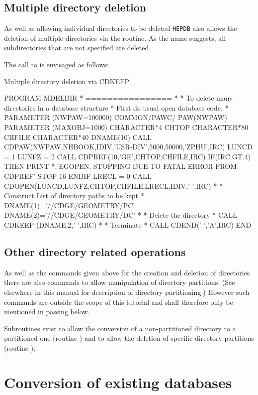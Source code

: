 \subsection{Multiple directory deletion}
As well as allowing individual directories to be deleted {\tt HEPDB} also
allows the deletion of multiple directories via the  routine.
As the name suggests, all subdirectories that are not specified are deleted.

The call to  is envisaged as follows:
%
\begin{XMPt}{Multiple directory deletion via CDKEEP}

      PROGRAM MDELDIR
*     ================
*
*     To delete many directories in a database structure
*     First do usual open database code.
*
      PARAMETER    (NWPAW=100000)
      COMMON/PAWC/ PAW(NWPAW)
      PARAMETER    (MAXOBJ=1000)
      CHARACTER*4  CHTOP
      CHARACTER*80 CHFILE
      CHARACTER*40 DNAME(10)
      CALL CDPAW(NWPAW,NHBOOK,IDIV,'USR-DIV',5000,50000,'ZPHU',IRC)
      LUNCD  = 1
      LUNFZ  = 2
      CALL CDPREF(10,'GE',CHTOP,CHFILE,IRC)
      IF(IRC.GT.4) THEN
         PRINT *,'EGOPEN. STOPPING DUE TO FATAL ERROR FROM CDPREF'
         STOP 16
      ENDIF
      LRECL  = 0
      CALL CDOPEN(LUNCD,LUNFZ,CHTOP,CHFILE,LRECL,IDIV,' ',IRC)
*
*     Construct List of directory paths to be kept
*
      DNAME(1)='//CDGE/GEOMETRY/PC'
      DNAME(2)='//CDGE/GEOMETRY/DC'
*
*     Delete the directory
*
      CALL CDKEEP (DNAME,2,' ',IRC)
*
*     Terminate
*
      CALL CDEND(' ','A',IRC)
      END

\end{XMPt}
%
%
%
\subsection{Other directory related operations}
As well as the commands given above for the creation and deletion of
directories there are also commands to allow manipulation of directory
partitions. (See elsewhere in this manual for description of directory
partitioning.) However such commands are outside the scope of this tutorial
and shall therefore only  be mentioned in passing below.

Subroutines exist to allow the conversion of a non-partitioned directory
to a partitioned one (routine ) and to allow the deletion of
specific directory partitions (routine ).
%
%
%
\section{Conversion of existing databases}

